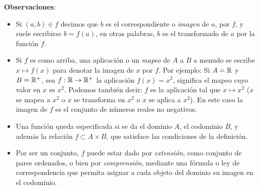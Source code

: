 \textbf{Observaciones}:
\begin{itemize}
	\item Si $(a, b) \in f$ decimos que $b$ es el correspondiente o \textit{imagen} de $a$,
	por $f$, y suele escribirse $b = f(a)$, en otras palabras, $b$ es el transformado de $a$
	por la función $f$.
	\item Si $f$ es como arriba, una aplicación o un \textit{mapeo} de $A$ a $B$ a menudo se escribe $x \mapsto f(x)$ para denotar la imagen de $x$ por $f$. Por ejemplo: Si $A = \mathbb{R}$ y  $B = \mathbb{R}^{+}$, sea $f: \mathbb{R} \rightarrow \mathbb{R}^{+}$ la aplicación $f(x) = x^2$, significa el mapeo cuyo valor en $x$ es $x^2$. Podemos también decir: $f$ es la aplicación tal que $x \mapsto x^2$ ($x$ se mapea a $x^2$ o $x$ se transforma en $x^2$ o $x$ se aplica a $x^2$). En este caso la imagen de $f$ es el conjunto de números reales no negativos.
	\item Una función queda especificada si se da el dominio $A$, el codominio $B$,
	y además la relación $f \subset A \times B$, que satisface las condiciones de la definición.
	\item Por ser un conjunto, $f$ puede estar dado por \textit{extensión}, como conjunto de pares ordenados, o bien por \textit{comprensión}, mediante una fórmula o ley de correspondencia que permita asignar a cada objeto del dominio su imagen en el codominio.
\end{itemize}%


